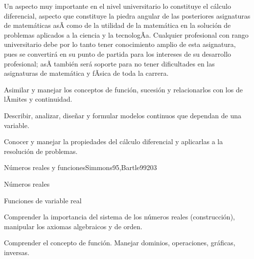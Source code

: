 \begin{syllabus}


\begin{justification}
Un aspecto muy importante en el nivel universitario lo constituye el cálculo diferencial,  aspecto que constituye la piedra angular de las posteriores asignaturas de matemáticas asÃ­ como de la utilidad de la matemática en la solución de problemas aplicados a la ciencia y la tecnologÃ­a. Cualquier profesional con rango universitario debe por lo tanto tener conocimiento amplio de esta asignatura, pues se convertirá en su punto de partida para los intereses de su desarrollo profesional; asÃ­ también será soporte para no tener dificultades en las asignaturas de matemática y fÃ­sica de toda la carrera.
\end{justification}

\begin{goals}
\item Asimilar y manejar los conceptos de función, sucesión y relacionarlos con los de lÃ­mites y continuidad.
\item Describir, analizar, diseñar y formular modelos continuos que dependan de una variable.
\item Conocer y manejar la propiedades del cálculo diferencial y aplicarlas a la resolución de problemas.
\end{goals}

\begin{outcomes}
\end{outcomes}

\begin{unit}{Números reales y funciones}{Simmons95,Bartle99}{20}{3}
   \begin{topics}
      \item Números reales
      \item Funciones de variable real
   \end{topics}

   \begin{learningoutcomes}
      \item Comprender la importancia del sistema de los números reales (construcción), manipular los axiomas algebraicos y de orden.
      \item Comprender el concepto de función. Manejar dominios, operaciones, gráficas, inversas.
      \end{learningoutcomes}
\end{unit}


\end{syllabus}
